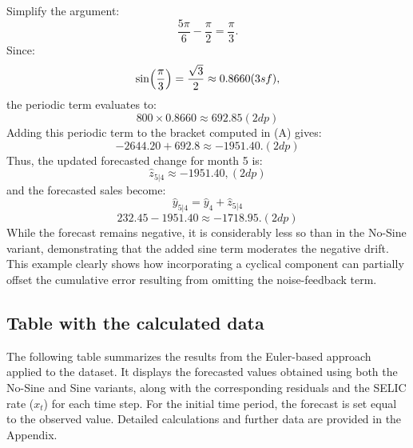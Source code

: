\documentclass{article}
\begin{document}
Simplify the argument:
\[
\frac{5\pi}{6} - \frac{\pi}{2} = \frac{\pi}{3}.
\]
Since:
\[
\sin\Bigl(\frac{\pi}{3}\Bigr) = \frac{\sqrt{3}}{2} \approx 0.8660 (3sf),
\]
the periodic term evaluates to:
\[
800 \times 0.8660 \approx 692.85(2dp)
\]
Adding this periodic term to the bracket computed in (A) gives:
\[
-2644.20 + 692.8 \approx -1951.40. (2dp)
\]
Thus, the updated forecasted change for month 5 is:
\[
\hat{z}_{5|4} \approx -1951.40, (2dp)
\]
and the forecasted sales become:
\[
\hat{y}_{5|4} = \hat{y}_4 + \hat{z}_{5|4}\] \[ 232.45 - 1951.40 \approx -1718.95. (2dp)
\]
While the forecast remains negative, it is considerably less so than in the No-Sine variant, demonstrating that the added sine term moderates the negative drift. This example clearly shows how incorporating a cyclical component can partially offset the cumulative error resulting from omitting the noise-feedback term.



\subsection{Table with the calculated data}

The following table summarizes the results from the Euler-based approach applied to the dataset. It displays the forecasted values obtained using both the No-Sine and Sine variants, along with the corresponding residuals and the SELIC rate (\(x_t\)) for each time step. For the initial time period, the forecast is set equal to the observed value. Detailed calculations and further data are provided in the Appendix.
\end{document}
